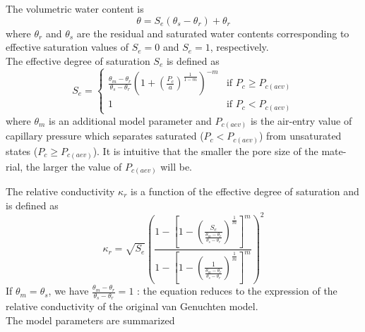 \documentclass[a4paper]{article}
\begin{document}
The volumetric water content is 
\begin{equation}\label{latticetransmat7}
\theta = S_{e} (\theta_{s} - \theta_{r})+\theta_{r}
\end{equation}
where $\theta_{r}$ and $\theta_{s}$ are the residual and saturated water contents corresponding to effective saturation values of $S_{e} = 0$ and $S_{e} = 1$, respectively. \\

The effective degree of saturation $S_{e}$ is defined as
\begin{equation}\label{latticetransmat8}
S_{e}  = \left\{
    \begin{array}{ll}
         \frac{\theta_{m}-\theta_{r}}{\theta_{s}-\theta_{r}}\left(1+\left(\frac{ P_{c}}{a}\right)^{\frac{1}{1-m}}\right)^{-m}  & \mbox{if } P_{c} \ge P_{c(aev)} \\
         1 & \mbox{if } P_{c}<P_{c(aev)}
    \end{array}
\right.
\end{equation}
where $\theta_{m}$ is an additional model parameter and $P_{c(aev)}$ is the air-entry value of capillary pressure which separates saturated ($P_{c}<P_{c(aev)}$) from unsaturated states ($P_{c} \ge P_{c(aev)}$). It is intuitive that the smaller the pore size of the mate- rial, the larger the value of $P_{c(aev)}$ will be.

The relative conductivity $\kappa_{r}$ is a function of the effective degree of saturation and is defined as
\begin{equation}\label{latticetransmat9}
\kappa_{r}  = \sqrt{S_{e}}\left(\frac{1-\left[1-\left(\frac{S_{e}}{  \frac{\theta_{m}-\theta_{r}}{\theta_{s}-\theta_{r}}}\right)^{\frac{1}{m}}\right]^{m}}{1-\left[1-\left(\frac{1}{  \frac{\theta_{m}-\theta_{r}}{\theta_{s}-\theta_{r}}}\right)^{\frac{1}{m}}\right]^{m}}\right)^{2}
\end{equation}
If $\theta_{m} = \theta_{s}$, we have $ \frac{\theta_{m}-\theta_{r}}{\theta_{s}-\theta_{r}}=1$ : the equation reduces to the expression of the relative conductivity of the original van Genuchten model.\\

The model parameters are summarized
\end{document}
